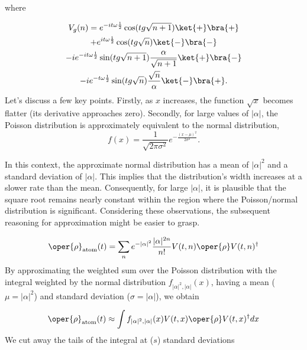 where

\begin{equation}
    \label{eq:appen_JCM_V_g}
\begin{gathered}
    V_g (n) =e^{-it\omega\frac{1}{2}}  \cos(tg\sqrt{n + 1})\ket{+}\bra{+}\\
+ e^{it\omega\frac{1}{2}} \cos(tg\sqrt{n})\ket{-}\bra{-}\\
- ie^{-it\omega\frac{1}{2}} \sin(tg\sqrt{n + 1}) \frac{\alpha}{\sqrt{n + 1}} \ket{+}\bra{-}\\
- ie^{-t\omega\frac{1}{2}} \sin(tg\sqrt{n}) \frac{\sqrt{n}}{\alpha} \ket{-}\bra{+}.
\end{gathered}
\end{equation}
Let's discuss a few key points. Firstly, as \( x \) increases, the function 
\( \sqrt{x} \) becomes flatter (its derivative approaches zero). Secondly, 
for large values of \( |\alpha| \), the Poisson distribution is approximately 
equivalent to the normal distribution, 
\begin{equation}
f(x) = \frac{1}{\sqrt{2\pi\sigma^2}} e^{-\frac{(x-\mu)^2}{2\sigma^2}}.
\end{equation}

In this context, the approximate normal distribution has a mean of \( |\alpha|^2 \) and a 
standard deviation of \( |\alpha| \). This implies that the distribution's width increases 
at a slower rate than the mean. Consequently, for large \( |\alpha| \), it is plausible 
that the square root remains nearly constant within the region where the Poisson/normal 
distribution is significant. Considering these observations, the subsequent reasoning 
for approximation might be easier to grasp.

\begin{equation}
\oper{\rho}_{\text{atom}}(t) = \sum_{n} e^{-|\alpha|^2} \frac{|\alpha|^{2n}}{n!} V(t, n) \oper{\rho} V(t, n)^{\dagger}
\end{equation}
By approximating the weighted sum over the Poisson distribution with the integral weighted by 
the normal distribution \( f_{|\alpha|^2, |\alpha|}(x) \), having a mean (\( \mu = |\alpha|^2 \)) 
and standard deviation (\( \sigma = |\alpha| \)), we obtain

\begin{equation}
    \oper{\rho}_{\text{atom}}(t)\approx \int f_{|\alpha|^2, |\alpha|}(x) V(t, x) \oper{\rho} V(t, x)^{\dagger} dx
\end{equation}
We cut away the tails of the integral at (\( s \)) standard deviations

